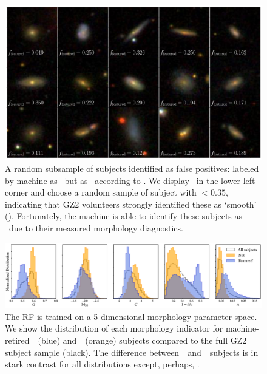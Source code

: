 \begin{figure}
\centering
\includegraphics[width=\textwidth]{Figures/human_machine/f12.pdf}
\caption[Random subsample of galaxy jpegs identified as false positives by the Random Forest]{A random subsample of subjects identified as false positives: labeled by machine as \feat~but as \notfeat~according to \raw. We display \ffeat~in the lower left corner and choose a random sample of subject with \ffeat$<0.35$, indicating that GZ2 volunteers strongly identified these as `smooth' (\notfeat). Fortunately, the machine is able to identify these subjects as \feat~due to their measured morphology diagnostics. \label{fig: machine false pos}}
\end{figure}


\begin{figure}
\centering
\includegraphics[width=\textwidth]{Figures/human_machine/morph_params_raw_labels_4paper.pdf}
\caption[Distributions of measured galaxy morphology features.]{The RF is trained on a 5-dimensional morphology parameter space. We show the distribution of each morphology indicator for machine-retired~\feat~(blue) and~\notfeat~(orange) subjects compared to the full GZ2 subject sample (black). The difference between~\feat~and~\notfeat~subjects is in stark contrast for all distributions except, perhaps, .  \label{fig: morph params}}
\end{figure}


